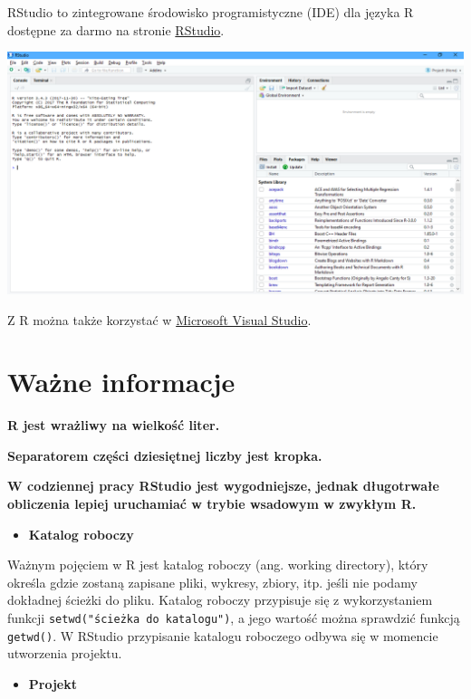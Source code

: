 \documentclass[
  letterpaper,
  DIV=11,
  numbers=noendperiod]{scrreprt}
\providecommand{\tightlist}{%
  \setlength{\itemsep}{0pt}\setlength{\parskip}{0pt}}\usepackage{longtable,booktabs,array}
\begin{document}
RStudio to zintegrowane środowisko programistyczne (IDE) dla języka R
dostępne za darmo na stronie
\href{https://www.rstudio.com/products/rstudio/download/}{RStudio}.

\includegraphics{./img/rstudio.png}

Z R można także korzystać w
\href{https://www.visualstudio.com/pl/vs/rtvs/}{Microsoft Visual
Studio}.

\hypertarget{waux17cne-informacje}{%
\section{Ważne informacje}\label{waux17cne-informacje}}

\textbf{R jest wrażliwy na wielkość liter.}

\textbf{Separatorem części dziesiętnej liczby jest kropka.}

\textbf{W codziennej pracy RStudio jest wygodniejsze, jednak długotrwałe
obliczenia lepiej uruchamiać w trybie wsadowym w zwykłym R.}

\begin{itemize}
\tightlist
\item
  \textbf{Katalog roboczy}
\end{itemize}

Ważnym pojęciem w R jest katalog roboczy (ang. working directory), który
określa gdzie zostaną zapisane pliki, wykresy, zbiory, itp. jeśli nie
podamy dokładnej ścieżki do pliku. Katalog roboczy przypisuje się z
wykorzystaniem funkcji \texttt{setwd("ścieżka\ do\ katalogu")}, a jego
wartość można sprawdzić funkcją \texttt{getwd()}. W RStudio przypisanie
katalogu roboczego odbywa się w momencie utworzenia projektu.

\begin{itemize}
\tightlist
\item
  \textbf{Projekt}
\end{itemize}
\end{document}
